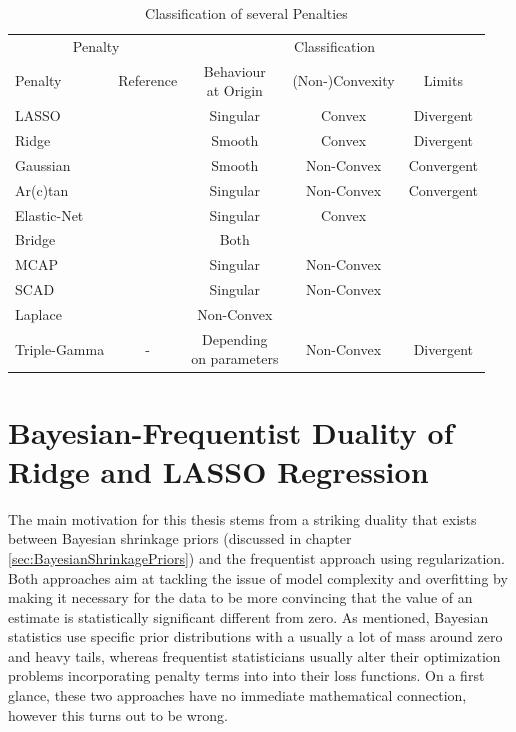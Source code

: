 \documentclass[12pt,a4paper]{article}
\begin{document}
\begin{table}[!h]
\begin{center}
\begin{tabular}{lcccc}\toprule
 \multicolumn{2}{c}{Penalty} & \multicolumn{3}{c}{Classification}\\
		\cmidrule(r{4pt}){1-2} \cmidrule(l){3-5}
Penalty     	& Reference  & \makecell{Behaviour\\ at Origin} & (Non-)Convexity & Limits\\\midrule

LASSO 	& \textcite{Tibishirani1996}	& Singular	&	Convex 	& Divergent\\
Ridge 	& \textcite{HoerlKennard1970a}	& Smooth		& Convex			& Divergent\\
Gaussian & \textcite{JohnVettamWu2022}	& Smooth		& Non-Convex 	& Convergent\\
Ar(c)tan 	& \textcite{WangZhu2016}	& Singular 	& Non-Convex 	& Convergent\\
Elastic-Net & \textcite{ZouHastie2005} & Singular & Convex &\\
Bridge & \textcite{FrankFriedman1993}& Both &&\\
MCAP & \textcite{Zhang2010}& Singular & Non-Convex &\\
SCAD & \textcite{FanLi2001} & Singular & Non-Convex &\\
Laplace & \textcite{TrzaskoManduca2009} & Non-Convex &&\\
Triple-Gamma & - & \makecell{Depending\\ on parameters} & Non-Convex & Divergent \\

\end{tabular}
\caption{Classification of several Penalties}
\label{tab:ClassificationOfPenalties}
\end{center}
\end{table}
 
\section{Bayesian-Frequentist Duality of Ridge and LASSO Regression}

The main motivation for this thesis stems from a striking duality that exists between Bayesian shrinkage priors (discussed in chapter \ref{sec:BayesianShrinkagePriors}) and the frequentist approach using regularization. Both approaches aim at tackling the issue of model complexity and overfitting by making it necessary for the data to be more convincing that the value of an estimate is statistically significant different from zero. As mentioned, Bayesian statistics use specific prior distributions with a usually a lot of mass around zero and heavy tails, whereas frequentist statisticians usually alter their optimization problems incorporating penalty terms into into their loss functions. On a first glance, these two approaches have no immediate mathematical connection, however this turns out to be wrong.\\
\end{document}
